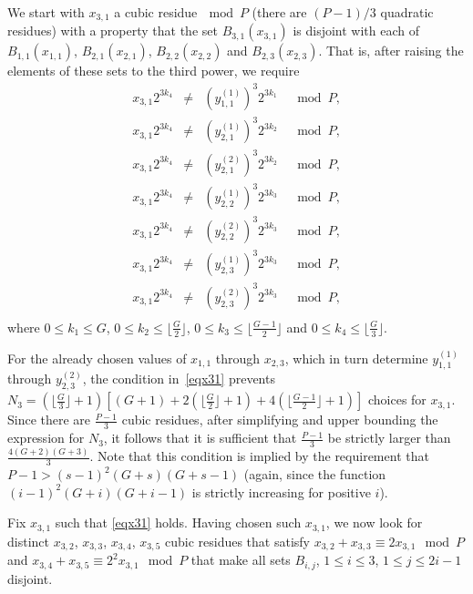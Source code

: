 We start with $x_{3,1}$ a cubic residue$~\mod P$ (there are
$(P-1)/3$ quadratic residues) with a property that the set
$B_{3,1}(x_{3,1})$ is disjoint with each of $B_{1,1}(x_{1,1})$,
$B_{2,1}(x_{2,1})$, $B_{2,2}(x_{2,2})$ and $B_{2,3}(x_{2,3})$.
That is, after raising the elements of these sets to the third
power, we require
\begin{equation}\label{eqx31}\begin{array}{cccc}
x_{3,1}2^{3k_4} &\neq& (y_{1,1}^{(1)})^3 2^{3k_1} &\mod P, \\
x_{3,1}2^{3k_4} &\neq& (y_{2,1}^{(1)})^3 2^{3k_2} &\mod P, \\
x_{3,1}2^{3k_4} &\neq& (y_{2,1}^{(2)})^3 2^{3k_2} &\mod P, \\
x_{3,1}2^{3k_4} &\neq& (y_{2,2}^{(1)})^3 2^{3k_3} &\mod P, \\
x_{3,1}2^{3k_4} &\neq& (y_{2,2}^{(2)})^3 2^{3k_3} &\mod P, \\
x_{3,1}2^{3k_4} &\neq& (y_{2,3}^{(1)})^3 2^{3k_3} &\mod P, \\
x_{3,1}2^{3k_4} &\neq& (y_{2,3}^{(2)})^3 2^{3k_3} &\mod P, \\
\end{array}\end{equation}
where $0 \leq k_1 \leq G$, $0 \leq k_2 \leq \lfloor \frac{G}{2}
\rfloor$, $0 \leq k_3 \leq \lfloor\frac{G-1}{2} \rfloor$ and $0
\leq k_4 \leq \lfloor\frac{G}{3} \rfloor$.

For the already chosen values of $x_{1,1}$ through $x_{2,3}$, which
in turn determine $y_{1,1}^{(1)}$ through $y_{2,3}^{(2)}$, the
condition in~\eqref{eqx31} prevents \newline$N_3= \left(\lfloor
\frac{G}{3} \rfloor +1 \right)\left[ (G+1)+2\left(\lfloor
\frac{G}{2} \rfloor +1 \right) +4\left(\lfloor \frac{G-1}{2} \rfloor
+1 \right)\right]$ choices for $x_{3,1}$. Since there are
$\frac{P-1}{3}$ cubic residues, after simplifying and upper bounding
the expression for $N_3$, it follows that it is sufficient that
$\frac{P-1}{3}$ be strictly larger than $\frac{4(G+2)(G+3)}{3}$.
Note that this condition is implied by the requirement that $P-1>
(s-1)^2(G+s)(G+s-1)$ (again, since the function
$(i-1)^2(G+i)(G+i-1)$ is strictly increasing for positive $i$).

Fix $x_{3,1}$ such that \eqref{eqx31} holds. Having chosen such
$x_{3,1}$, we now look for distinct $x_{3,2}$, $x_{3,3}$,
$x_{3,4}$, $x_{3,5}$ cubic residues that satisfy $x_{3,2}+x_{3,3}
\equiv 2x_{3,1} \mod P$ and $x_{3,4}+x_{3,5} \equiv 2^2x_{3,1}
\mod P$ that make all sets $B_{i,j}$, $1 \leq i \leq 3$, $1 \leq j
\leq 2i-1$ disjoint.

